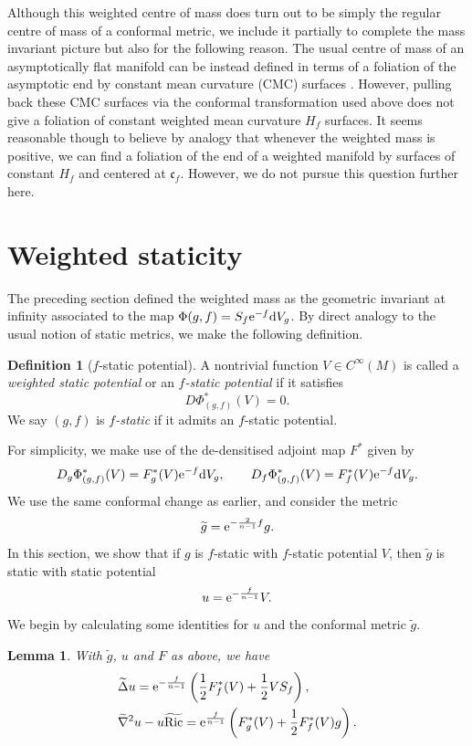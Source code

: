 \documentclass[pdftex]{sigma}
\numberwithin{equation}{section}
\newtheorem{Lemma}[Theorem]{Lemma}
\theoremstyle{definition}
\newtheorem{Definition}[Theorem]{Definition}
\begin{document}
Although this weighted centre of mass does turn out to be simply the regular centre of mass of a conformal metric, we include it partially to complete the mass invariant picture but also for the following reason. The usual centre of mass of an asymptotically flat manifold can be instead defined in terms of a foliation of the asymptotic end by constant mean curvature (CMC) surfaces \cite{HuiskenYau96}. However, pulling back these CMC surfaces via the conformal transformation used above does not give a foliation of constant weighted mean curvature $H_f$ surfaces. It seems reasonable though to believe by analogy that whenever the weighted mass is positive, we can find a foliation of the end of a weighted manifold by surfaces of constant $H_f$ and centered at $\mathfrak c_f$. However, we do not pursue this question further here.

\section{Weighted staticity}\label{sec-f-static}

The preceding section defined the weighted mass as the geometric invariant at infinity associated to the map $\Phi(g,f)=S_f{\rm e}^{-f}{\rm d}V_g$. By direct analogy to the usual notion of static metrics, we make the following definition.

\begin{Definition}[$f$-static potential]\label{def-f-static}
	A nontrivial function $V\in C^\infty(M)$ is called a \emph{weighted static potential} or an \emph{$f$-static potential} if it satisfies
	\[
	D\Phi_{(g,f)}^*(V)=0.
	\]
	We say $(g,f)$ is \emph{$f$-static} if it admits an $f$-static potential.
\end{Definition}
For simplicity, we make use of the de-densitised adjoint map $F^*$ given by
\begin{equation*}%
	D_g\Phi^*_{(g,f)}(V)=F_g^*(V) {\rm e}^{-f}{\rm d}V_g,
	\qquad
	D_f\Phi^*_{(g,f)}(V)=F_f^*(V) {\rm e}^{-f}{\rm d}V_g.
\end{equation*}
We use the same conformal change as earlier, and consider the metric
\[
\widetilde g = {\rm e}^{-\frac{2}{n-1}f} g.
\]
In this section, we show that if $g$ is $f$-static with $f$-static potential $V$, then $\widetilde g$ is static with static potential
\[
u={\rm e}^{-\frac{f}{n-1}}V.
\]
We begin by calculating some identities for $u$ and the conformal metric $\widetilde g$.

\begin{Lemma}\label{lem-fstatic-conf-identities}
	With $\widetilde g$, $u$ and $F$ as above, we have
	\begin{align}
		\label{eq-conf-lap}
&		\widetilde\Delta u
={\rm e}^{-\frac{f}{n-1}}\left(\frac12 F_f^*(V)+\frac12 V S_f\right),\\
		\label{eq-conf-hessric}
&		\widetilde\nabla^2 u-u \widetilde{\mathrm{Ric}}
={\rm e}^{\frac{f}{n-1}}\left(F_g^*(V)+\frac12 F_f^*(V) g\right).
	\end{align}
\end{Lemma}
\end{document}
